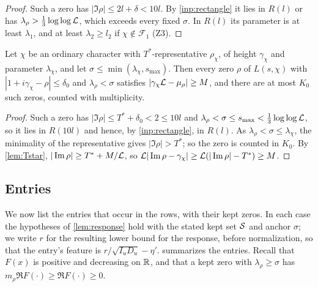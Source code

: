 \begin{proof}
Such a zero has $|\Im\rho|\le2l+\delta<10l$. By \cref{inp:rectangle} it lies in $R(l)$ or has
$\lambda_\rho>\frac13\log\log\mathcal{L}$, which exceeds every fixed $\sigma$. In $R(l)$ its parameter is at least
$\lambda_1$, and at least $\lambda_2\ge l_2$ if $\chi\notin \mathcal F_1$ (Z3).
\end{proof}

\begin{lemma}\label{lem:strip}
Let $\chi$ be an ordinary character with $T^*$-representative $\rho_\chi$, of height $\gamma_\chi$ and
parameter $\lambda_\chi$, and let $\sigma\le\min(\lambda_\chi,s_{\max})$. Then every zero $\rho$ of $L(s,\chi)$ with
$|1+i\gamma_\chi-\rho|\le\delta_0$ and $\lambda_\rho<\sigma$ satisfies $|\gamma_\chi\mathcal{L}-\mu_\rho|\ge M$, and there are at
most $K_0$ such zeros, counted with multiplicity.
\end{lemma}

\begin{proof}
Such a zero has $|\Im\rho|\le T^*+\delta_0<2\le10l$ and $\lambda_\rho<\sigma\le s_{\max}<\frac13\log\log\mathcal{L}$, so it
lies in $R(10l)$ and hence, by \cref{inp:rectangle}, in $R(l)$. As $\lambda_\rho<\sigma\le\lambda_\chi$, the minimality
of the representative gives $|\Im\rho|>T^*$; so the zero is counted in $K_0$. By \cref{lem:Tstar},
$|\operatorname{Im}\rho|\ge T^*+M/\mathcal{L}$, so $\mathcal{L}|\operatorname{Im}\rho-\gamma_\chi|\ge\mathcal{L}(|\operatorname{Im}\rho|-T^*)\ge M$.
\end{proof}

\subsection{Entries}\label{subsec:entries}
We now list the entries that occur in the rows, with their kept zeros. In each case the
hypotheses of \cref{lem:response} hold with the stated kept set $\mathcal{S}$ and anchor $\sigma$; we write
$r$ for the resulting lower bound for the response, before normalization, so that the entry's
feature is $r/\sqrt{I_uD_u}-\eta'$.  summarizes the entries. Recall that $F(x)$ is
positive and decreasing on $\mathbb{R}$, and that a kept zero with $\lambda_\rho\ge\sigma$ has
$m_\rho\Re F(\cdot)\ge\Re F(\cdot)\ge0$.

